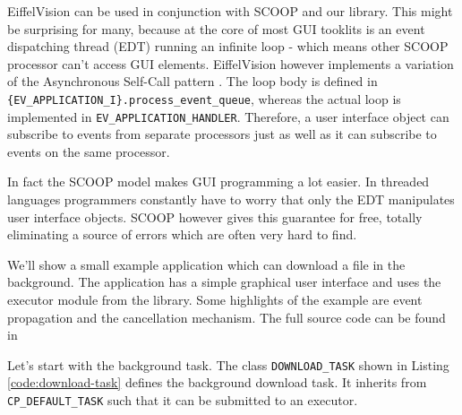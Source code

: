 EiffelVision can be used in conjunction with SCOOP and our library.
This might be surprising for many, because at the core of most GUI tooklits is an event dispatching thread (EDT) running an infinite loop - which means other SCOOP processor can't access GUI elements.
EiffelVision however implements a variation of the Asynchronous Self-Call pattern .
The loop body is defined in \lstinline!{EV_APPLICATION_I}.process_event_queue!, whereas the actual loop is implemented in \lstinline!EV_APPLICATION_HANDLER!.
Therefore, a user interface object can subscribe to events from separate processors just as well as it can subscribe to events on the same processor.

In fact the SCOOP model makes GUI programming a lot easier.
In threaded languages programmers constantly have to worry that only the EDT manipulates user interface objects.
SCOOP however gives this guarantee for free, totally eliminating a source of errors which are often very hard to find.

We'll show a small example application which can download a file in the background.
The application has a simple graphical user interface and uses the executor module from the library.
Some highlights of the example are event propagation and the cancellation mechanism.
The full source code can be found in 

Let's start with the background task.
The class \lstinline!DOWNLOAD_TASK! shown in Listing \ref{code:download-task} defines the background download task.
It inherits from \lstinline!CP_DEFAULT_TASK! such that it can be submitted to an executor.

